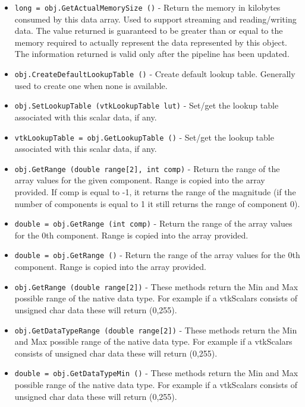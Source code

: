\begin{itemize}
\item  \verb|long = obj.GetActualMemorySize ()| -  Return the memory in kilobytes consumed by this data array. Used to
 support streaming and reading/writing data. The value returned is
 guaranteed to be greater than or equal to the memory required to
 actually represent the data represented by this object. The 
 information returned is valid only after the pipeline has 
 been updated.

\item  \verb|obj.CreateDefaultLookupTable ()| -  Create default lookup table. Generally used to create one when none
 is available.

\item  \verb|obj.SetLookupTable (vtkLookupTable lut)| -  Set/get the lookup table associated with this scalar data, if any.

\item  \verb|vtkLookupTable = obj.GetLookupTable ()| -  Set/get the lookup table associated with this scalar data, if any.

\item  \verb|obj.GetRange (double range[2], int comp)| -  Return the range of the array values for the given component.
 Range is copied into the array provided.
 If comp is equal to -1, it returns the range of the magnitude
 (if the number of components is equal to 1 it still returns the range of
 component 0).

\item  \verb|double = obj.GetRange (int comp)| -  Return the range of the array values for the 0th component. 
 Range is copied into the array provided.

\item  \verb|double = obj.GetRange ()| -  Return the range of the array values for the 0th component. 
 Range is copied into the array provided.

\item  \verb|obj.GetRange (double range[2])| -  These methods return the Min and Max possible range of the native
 data type. For example if a vtkScalars consists of unsigned char
 data these will return (0,255). 

\item  \verb|obj.GetDataTypeRange (double range[2])| -  These methods return the Min and Max possible range of the native
 data type. For example if a vtkScalars consists of unsigned char
 data these will return (0,255). 

\item  \verb|double = obj.GetDataTypeMin ()| -  These methods return the Min and Max possible range of the native
 data type. For example if a vtkScalars consists of unsigned char
 data these will return (0,255). 


\end{itemize}
